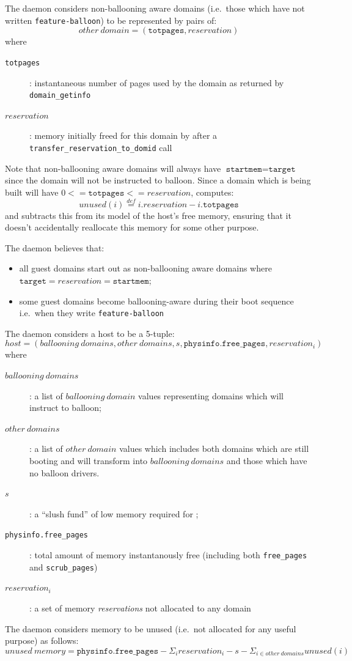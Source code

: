 \documentclass{article}
\newcommand{\eqdef}{\stackrel{def}{=}}
\begin{document}
The \squeezed{} daemon considers non-ballooning aware domains (i.e.\ those which have not written \texttt{feature-balloon}) to be represented by pairs of:
\[
\mathit{other~domain} = (\texttt{totpages}, \mathit{reservation})
\]
where
\begin{description}
\item[\texttt{totpages}]: instantaneous number of pages used by the domain
  as returned by \texttt{domain\_getinfo}
\item[$\mathit{reservation}$]: memory initially freed for this domain by
  \squeezed{} after a \texttt{transfer\_reservation\_to\_domid} call
\end{description}
Note that non-ballooning aware domains will always have
$\texttt{startmem}=\texttt{target}$ since the domain will not be instructed
to balloon. Since a domain which is being built will have
$0<=\texttt{totpages}<=\mathit{reservation}$, \squeezed{} computes:
\[
\mathit{unused}(i) \eqdef i.\mathit{reservation} - i.\texttt{totpages}
\]
and subtracts this from its model of the host's free memory, ensuring that it doesn't accidentally reallocate this memory for some other purpose.


The \squeezed{} daemon believes that:
\begin{itemize}
\item all guest domains start out as non-ballooning aware domains where $\texttt{target}=\mathit{reservation}=\texttt{startmem}$;
\item some guest domains become ballooning-aware during their boot sequence i.e.\ when they write \texttt{feature-balloon}
\end{itemize}

The \squeezed{} daemon considers a host to be a 5-tuple:
\[
\mathit{host} = (\mathit{ballooning~domains}, \mathit{other~domains}, s, \texttt{physinfo.free\_pages}, \mathit{reservation}_i)
\]
where
\begin{description}
\item[$\mathit{ballooning~domains}$]: a list of $\mathit{ballooning~domain}$
  values representing domains which \squeezed{} will instruct to balloon;
\item[$\mathit{other~domains}$]: a list of $\mathit{other~domain}$ values
  which includes both domains which are still booting and will transform
  into $\mathit{ballooning~domains}$ and those which have no balloon drivers.
\item[$s$]: a ``slush fund'' of low memory required for \xen{};
\item[\texttt{physinfo.free\_pages}]: total amount of memory instantanously free (including both \texttt{free\_pages} and \texttt{scrub\_pages})
\item[$\mathit{reservation}_i$]: a set of memory {\em reservations} not allocated to any domain
\end{description}
The \squeezed{} daemon considers memory to be unused (i.e.\ not allocated for any useful purpose) as follows:
\[
\mathit{unused~memory} = \texttt{physinfo.free\_pages} -
\Sigma_i\mathit{reservation}_i - s - \Sigma_{i\in\mathit{other~domains}}\mathit{unused}(i)
\]
\end{document}
